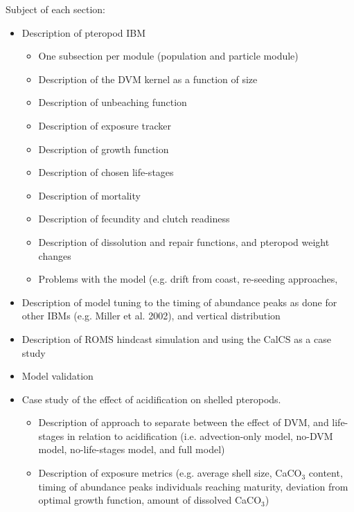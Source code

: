 Subject of each section:
\begin{itemize}
    \item Description of pteropod IBM
        \begin{itemize}
            \item One subsection per module (population and particle module)
            \item Description of the DVM kernel as a function of size
            \item Description of unbeaching function
            \item Description of exposure tracker
            \item Description of growth function
            \item Description of chosen life-stages
            \item Description of mortality
            \item Description of fecundity and clutch readiness
            \item Description of dissolution and repair functions, and pteropod weight changes
            \item Problems with the model (e.g. drift from coast, re-seeding approaches, 
        \end{itemize}
    \item Description of model tuning to the timing of abundance peaks as done for other IBMs (e.g. Miller et al. 2002), and vertical distribution
    \item Description of ROMS hindcast simulation and using the CalCS as a case study
    \item Model validation
    
    
    \item Case study of the effect of acidification on shelled pteropods.
    \begin{itemize}
        \item Description of approach to separate between the effect of DVM, and life-stages in relation to acidification (i.e. advection-only model, no-DVM model, no-life-stages model, and full model)
        
        \item Description of exposure metrics (e.g. average shell size, CaCO$_3$ content, timing of abundance peaks individuals reaching maturity, deviation from optimal growth function, amount of dissolved CaCO$_3$)
    \end{itemize}
    
    
\end{itemize}